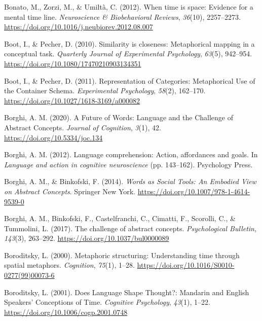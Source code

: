 \documentclass[
  a4paper,12pt,twoside,onecolumn,openright,final,oldfontcommands]{memoir}
\newlength{\cslhangindent}
\newlength{\cslentryspacingunit} %
\newenvironment{CSLReferences}[2] %
 {%
  \setlength{\parindent}{0pt}
  \ifodd #1
  \let\oldpar\par
  \def\par{\hangindent=\cslhangindent\oldpar}
  \fi
  \setlength{\parskip}{#2\cslentryspacingunit}
 }%
 {}
\begin{document}
\begin{CSLReferences}{1}{0}
\leavevmode{}%
Bonato, M., Zorzi, M., \& Umiltà, C. (2012). When time is space: {Evidence} for a mental time line. \emph{Neuroscience \& Biobehavioral Reviews}, \emph{36}(10), 2257--2273. \url{https://doi.org/10.1016/j.neubiorev.2012.08.007}

\leavevmode{}%
Boot, I., \& Pecher, D. (2010). Similarity is closeness: {Metaphorical} mapping in a conceptual task. \emph{Quarterly Journal of Experimental Psychology}, \emph{63}(5), 942--954. \url{https://doi.org/10.1080/17470210903134351}

\leavevmode{}%
Boot, I., \& Pecher, D. (2011). Representation of {Categories}: {Metaphorical} {Use} of the {Container} {Schema}. \emph{Experimental Psychology}, \emph{58}(2), 162--170. \url{https://doi.org/10.1027/1618-3169/a000082}

\leavevmode{}%
Borghi, A. M. (2020). A {Future} of {Words}: {Language} and the {Challenge} of {Abstract} {Concepts}. \emph{Journal of Cognition}, \emph{3}(1), 42. \url{https://doi.org/10.5334/joc.134}

\leavevmode{}%
Borghi, A. M. (2012). Language comprehension: Action, affordances and goals. In \emph{Language and action in cognitive neuroscience} (pp. 143--162). Psychology Press.

\leavevmode{}%
Borghi, A. M., \& Binkofski, F. (2014). \emph{Words as {Social} {Tools}: {An} {Embodied} {View} on {Abstract} {Concepts}}. Springer New York. \url{https://doi.org/10.1007/978-1-4614-9539-0}

\leavevmode{}%
Borghi, A. M., Binkofski, F., Castelfranchi, C., Cimatti, F., Scorolli, C., \& Tummolini, L. (2017). The challenge of abstract concepts. \emph{Psychological Bulletin}, \emph{143}(3), 263--292. \url{https://doi.org/10.1037/bul0000089}

\leavevmode{}%
Boroditsky, L. (2000). Metaphoric structuring: Understanding time through spatial metaphors. \emph{Cognition}, \emph{75}(1), 1--28. \url{https://doi.org/10.1016/S0010-0277(99)00073-6}

\leavevmode{}%
Boroditsky, L. (2001). Does {Language} {Shape} {Thought}?: {Mandarin} and {English} {Speakers}' {Conceptions} of {Time}. \emph{Cognitive Psychology}, \emph{43}(1), 1--22. \url{https://doi.org/10.1006/cogp.2001.0748}


\end{CSLReferences}
\end{document}
